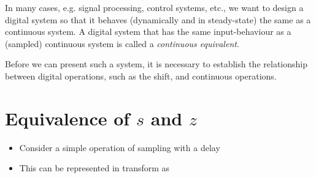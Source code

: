 \def\FileDate{98/12/02}
\def\FileVersion{1.0}

In many cases, e.g. signal processing, control systems, etc., we want to design a digital system so that it behaves
(dynamically and in steady-state) the same as a continuous
system. A digital system that has the same input-behaviour as
a (sampled) continuous system is called a \emph{continuous
  equivalent}.

Before we can present such a system, it is necessary to establish the
relationship between digital operations, such as the shift, and
continuous operations.

\section*{Equivalence of $s$ and $z$}

\begin{slide}\label{slide:l11s1}
\begin{itemize}
  \item Consider a simple operation of sampling with a delay
  \begin{center}
  \end{center}
  \item This can be represented in transform as
  \begin{center}
  \end{center}
\end{itemize}
\end{slide}

